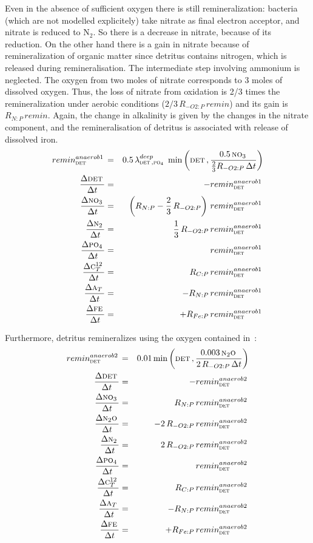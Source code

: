 \documentclass[11pt,a4paper,fleqn,twoside]{article}
\def\pho{\text{\textsc{po$_4$}}\,}
\def\nit{\text{\textsc{no$_3$}}\,}
\def\ntwo{\text{\textsc{n$_2$}}\,}
\def\ntwoo{\text{\textsc{n$_2$o}}\,}
\def\car{\text{\textsc{c$_T^{12}$}}\,}
\def\alk{\text{\textsc{a$_T$}}\,}
\def\det{\text{\textsc{det}}\,}
\def\fe{\text{\textsc{fe}}\,}
\begin{document}
Even in the absence of sufficient oxygen there is still remineralization:
bacteria (which are not modelled explicitely) take  nitrate as
final electron acceptor, and nitrate is reduced to N$_2$. So there is a decrease in
nitrate, because of its reduction. On the other hand there is a gain in nitrate
because of remineralization of organic matter since
detritus contains nitrogen, which is released during remineralisation. The
intermediate step involving ammonium is neglected.  The oxygen from
two moles of nitrate corresponds to 3 moles of dissolved oxygen. Thus, the
loss of nitrate from oxidation is 2/3 times the remineralization under
aerobic conditions ($ 2/3 \, R_{-O2:P} \, remin$) and its gain is $
R_{N:P} \, remin$.  Again, the change in alkalinity is given by the changes in
the nitrate component, and the remineralisation of detritus is associated with
release of dissolved iron.
\begin{eqnarray}
remin^{anaerob1}_\det& = & 0.5 \, \lambda_{\det,\pho}^{deep} \,
\min\left(\det ,\frac{0.5\,\nit}{\frac{2}{3} R_{-O2:P}\, \Delta t}  \right)
\nonumber\\ 
\label{eq_det_anaerob1}\frac{\Delta \det}{\Delta  t} & = & - remin^{anaerob1}_\det\\
\frac{\Delta \nit}{\Delta  t} & = &  \left(R_{N:P} - \frac{2}{3} \, R_{-O2:P}\right) 
\, remin^{anaerob1}_\det \\
\frac{\Delta \ntwo}{\Delta  t} & = & \frac{1}{3} \,R_{-O2:P} \, remin^{anaerob1}_\det\\
\frac{\Delta \pho}{\Delta  t} & = & remin^{anaerob1}_\det\\
\frac{\Delta \car}{\Delta  t} & = & R_{C:P} \, remin^{anaerob1}_\det\\
\frac{\Delta \alk}{\Delta  t} & = & -R_{N:P} \, remin^{anaerob1}_\det\\
\frac{\Delta \fe}{\Delta  t} & = & +R_{Fe:P} \, remin^{anaerob1}_\det
\end{eqnarray}

Furthermore, detritus remineralizes using the oxygen contained
in \ntwoo:
\begin{eqnarray}
remin^{anaerob2}_\det& = & 0.01 
\min\left(\det ,\frac{0.003\,\ntwoo}{2\,R_{-O2:P}\, \Delta t}  \right)
\nonumber\\ 
\label{eq_det_anaerob2}\frac{\Delta \det}{\Delta  t} & = & 
- remin^{anaerob2}_\det\\
\frac{\Delta \nit}{\Delta  t} & = &  R_{N:P} \, remin^{anaerob2}_\det \\
\frac{\Delta \ntwoo}{\Delta  t} & = & - 2 \,R_{-O2:P} \, remin^{anaerob2}_\det\\
\frac{\Delta \ntwo}{\Delta  t} & = & 2 \,R_{-O2:P} \, remin^{anaerob2}_\det\\
\frac{\Delta \pho}{\Delta  t} & = & remin^{anaerob2}_\det\\
\frac{\Delta \car}{\Delta  t} & = & R_{C:P} \, remin^{anaerob2}_\det\\
\frac{\Delta \alk}{\Delta  t} & = & -R_{N:P} \, remin^{anaerob2}_\det\\
\frac{\Delta \fe}{\Delta  t} & = & +R_{Fe:P} \, remin^{anaerob2}_\det
\end{eqnarray}
\end{document}
